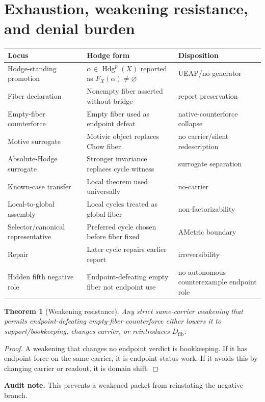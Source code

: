 \documentclass[11pt]{article}
\newtheorem{theorem}{Theorem}[section]
\newcommand{\Hdg}{\operatorname{Hdg}}
\begin{document}
\section{Exhaustion, weakening resistance, and denial burden}


\begin{longtable}{p{}p{}p{}}
\toprule
Locus & Hodge form & Disposition \\
\midrule
\endhead
Hodge-standing promotion & $\alpha\in\Hdg^p(X)$ reported as $F_X(\alpha)\neq\varnothing$ & UEAP/no-generator \\
Fiber declaration & Nonempty fiber asserted without bridge & report preservation \\
Empty-fiber counterforce & Empty fiber used as endpoint defeat & native-counterforce collapse \\
Motive surrogate & Motivic object replaces Chow fiber & no carrier/silent redescription \\
Absolute-Hodge surrogate & Stronger invariance replaces cycle witness & surrogate separation \\
Known-case transfer & Local theorem used universally & no-carrier \\
Local-to-global assembly & Local cycles treated as global fiber & non-factorizability \\
Selector/canonical representative & Preferred cycle chosen before fiber fixed & AMetric boundary \\
Repair & Later cycle repairs earlier report & irreversibility \\
Hidden fifth negative role & Endpoint-defeating empty fiber not endpoint use & no autonomous counterexample endpoint role \\
\bottomrule
\end{longtable}

\begin{theorem}[Weakening resistance]
Any strict same-carrier weakening that permits endpoint-defeating empty-fiber counterforce either lowers it to support/bookkeeping, changes carrier, or reintroduces $D_{\mathrm{fib}}$.
\end{theorem}
\begin{proof}
A weakening that changes no endpoint verdict is bookkeeping. If it has endpoint force on the same carrier, it is endpoint-status work. If it avoids this by changing carrier or readout, it is domain shift.
\end{proof}
\par\noindent\textbf{Audit note.} This prevents a weakened packet from reinstating the negative branch.
\end{document}
